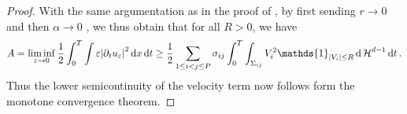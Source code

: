 \begin{proof}
	With the same argumentation as in the proof of 
	, by first sending $ r \to 0 $ and then 
	$ \alpha \to 0$ , we thus obtain that for all $R > 0 $, we have
	\begin{equation*}
		A = \liminf_{ \varepsilon \to 0 } \frac{ 1 }{ 2 }
		\int_{ 0 }^{ T }
			\int
				\varepsilon \abs{ \partial_{ t } u_{ \varepsilon } }^{ 2 }
			\dd{ x }
		\dd{ t }
		\geq
		\frac{ 1 }{ 2 }
		\sum_{ 1 \leq i < j \leq P }
			\sigma_{ i j }
			\int_{ 0 }^{ T }
				\int_{ \Sigma_{ i j } }
					V_{ i }^{ 2 }
					\mathds{ 1 }_{ \abs{ V_{ i } } \leq R }
				\dd{ \hm^{ d - 1 } }
			\dd{ t }.
	\end{equation*}
	Thus the lower semicontinuity of the velocity term now follows form the 
	monotone convergence theorem.
\end{proof}

